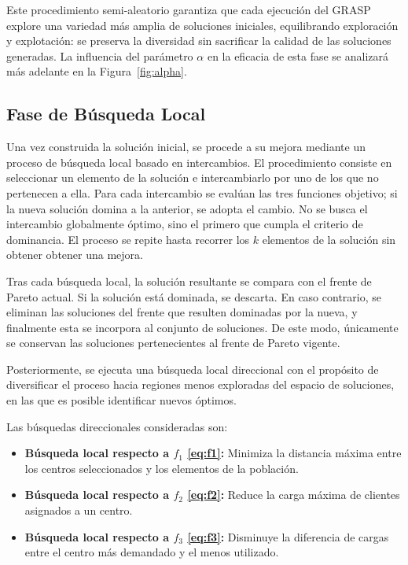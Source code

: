 \documentclass[12pt,a4paper]{book}
\begin{document}
Este procedimiento semi-aleatorio garantiza que cada ejecución del GRASP explore una variedad más amplia de soluciones iniciales, equilibrando exploración y explotación: se preserva la diversidad sin sacrificar la calidad de las soluciones generadas. La influencia del parámetro $\alpha$ en la eficacia de esta fase se analizará más adelante en la Figura~\ref{fig:alpha}.

\subsection{Fase de Búsqueda Local}
Una vez construida la solución inicial, se procede a su mejora mediante un proceso de búsqueda local basado en intercambios. El procedimiento consiste en seleccionar un elemento de la solución e intercambiarlo por uno de los que no pertenecen a ella. Para cada intercambio se evalúan las tres funciones objetivo; si la nueva solución domina a la anterior, se adopta el cambio. No se busca el intercambio globalmente óptimo, sino el primero que cumpla el criterio de dominancia. El proceso se repite hasta recorrer los $k$ elementos de la solución sin obtener obtener una mejora.

Tras cada búsqueda local, la solución resultante se compara con el frente de Pareto actual. Si la solución está dominada, se descarta. En caso contrario, se eliminan las soluciones del frente que resulten dominadas por la nueva, y finalmente esta se incorpora al conjunto de soluciones. De este modo, únicamente se conservan las soluciones pertenecientes al frente de Pareto vigente.

Posteriormente, se ejecuta una búsqueda local direccional con el propósito de diversificar el proceso hacia regiones menos exploradas del espacio de soluciones, en las que es posible identificar nuevos óptimos.  

Las búsquedas direccionales consideradas son:  

\begin{itemize}
    \item \textbf{Búsqueda local respecto a $f_1$ \ref{eq:f1}:} Minimiza la distancia máxima entre los centros seleccionados y los elementos de la población.
    \item \textbf{Búsqueda local respecto a $f_2$ \ref{eq:f2}:} Reduce la carga máxima de clientes asignados a un centro.
    \item \textbf{Búsqueda local respecto a $f_3$ \ref{eq:f3}:} Disminuye la diferencia de cargas entre el centro más demandado y el menos utilizado.
\end{itemize}
\end{document}
